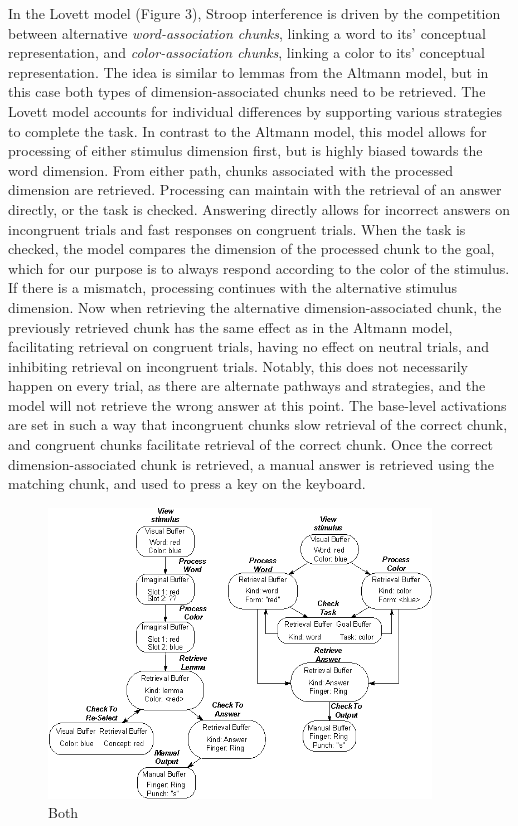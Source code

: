 \documentclass[10pt,letterpaper]{article}
\begin{document}
In the Lovett model (Figure 3), Stroop interference is driven by the competition between alternative \textit{word-association chunks}, linking a word to its' conceptual representation, and \textit{color-association chunks}, linking a color to its' conceptual representation. The idea is similar to lemmas from the Altmann model, but in this case both types of dimension-associated chunks need to be retrieved. The Lovett model accounts for individual differences by supporting various strategies to complete the task. In contrast to the Altmann model, this model allows for processing of either stimulus dimension first, but is highly biased towards the word dimension. From either path, chunks associated with the processed dimension are retrieved. Processing can maintain with the retrieval of an answer directly, or the task is checked. Answering directly allows for incorrect answers on incongruent trials and fast responses on congruent trials. When the task is checked, the model compares the dimension of the processed chunk to the goal, which for our purpose is to always respond according to the color of the stimulus. If there is a mismatch, processing continues with the alternative stimulus dimension. Now when retrieving the alternative dimension-associated chunk, the previously retrieved chunk has the same effect as in the Altmann model, facilitating retrieval on congruent trials, having no effect on neutral trials, and inhibiting retrieval on incongruent trials. Notably, this does not necessarily happen on every trial, as there are alternate pathways and strategies, and the model will not retrieve the wrong answer at this point. The base-level activations are set in such a way that incongruent chunks slow retrieval of the correct chunk, and congruent chunks facilitate retrieval of the correct chunk. Once the correct dimension-associated chunk is retrieved, a manual answer is retrieved using the matching chunk, and used to press a key on the keyboard. 

\begin{figure}[ht]
 \centering
 \includegraphics[width=4in]{both_models.eps}
  \caption{Both}
\end{figure}%
\end{document}
